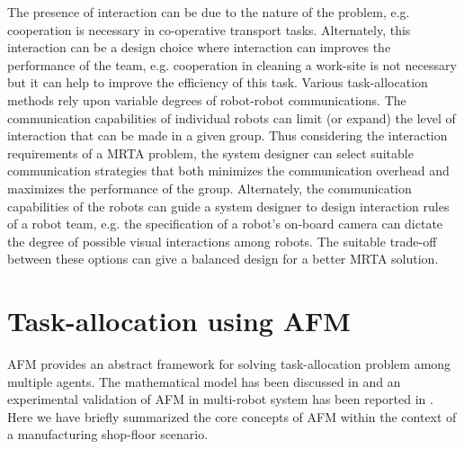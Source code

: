 \documentclass[journal]{IEEEtran}
\begin{document}
The presence of interaction can be due to the nature of the problem, e.g. cooperation is necessary in co-operative transport tasks. Alternately, this interaction can be a design choice where interaction can improves the performance of the team, e.g. cooperation in cleaning a work-site is not necessary but it can help to improve the efficiency of this task. %
Various task-allocation methods rely upon variable degrees of robot-robot communications.  The communication capabilities of individual robots can limit (or expand) the level of interaction that can be made in a given group. Thus  considering the interaction requirements of a MRTA problem, the system designer can select suitable communication strategies that both minimizes the communication overhead and maximizes the performance of the group. Alternately, the communication capabilities of the robots can guide a system designer to design interaction rules of a robot team, e.g. the specification of a robot's on-board camera can dictate the degree of possible visual interactions among robots. The suitable trade-off between these options can give a balanced design for a better MRTA solution.
\section{Task-allocation using AFM}
\label{sec:afm-mrta}
AFM provides an abstract framework for solving task-allocation problem among multiple agents. The mathematical model has been discussed in \cite{Arcaute+2008} and an experimental validation of AFM in multi-robot system has been reported in \cite{Sarker2010}. Here we have briefly summarized the core concepts of AFM within the context of a  manufacturing shop-floor scenario.
\end{document}
